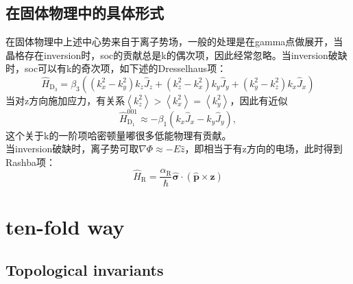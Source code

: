 \documentclass[10pt,openany]{book}
\theoremstyle{thmstyle} %
\theoremstyle{defstyle} %
\theoremstyle{prostyle} %
\begin{document}
\subsection{在固体物理中的具体形式}
在固体物理中上述中心势来自于离子势场，一般的处理是在gamma点做展开，当晶格存在inversion时，soc的贡献总是k的偶次项，因此经常忽略。当inversion破缺时，soc可以有k的奇次项，如下述的Dresselhaus项：
\begin{equation}
  \hat{H}_{\mathrm{D}_3}=\beta_3\left(\left(k_x^2-k_y^2\right) k_z \hat{J}_z+\left(k_z^2-k_x^2\right) k_y \hat{J}_y+\left(k_y^2-k_z^2\right) k_x \hat{J}_x\right)
\end{equation}
当对z方向施加应力，有关系$ \left\langle k_z^2\right\rangle>\left\langle k_x^2\right\rangle=\left\langle k_y^2\right\rangle $，因此有近似
\begin{equation}
  \hat{H}_{\mathrm{D}_1}^{001} \approx-\beta_1\left(k_x \hat{J}_x-k_y \hat{J}_y\right),
\end{equation}
这个关于k的一阶项哈密顿量嘟很多低能物理有贡献。\\
当inversion破缺时，离子势可取$ \nabla \Phi \approx-E \hat{z} $，即相当于有z方向的电场，此时得到Rashba项：
\begin{equation}
  \hat{H}_{\mathrm{R}}=\frac{\alpha_{\mathrm{R}}}{\hbar} \hat{\boldsymbol{\sigma}} \cdot(\hat{\mathbf{p}} \times \mathbf{z})
\end{equation} 
 
\section{ten-fold way}
\subsection{Topological invariants}
\end{document}
